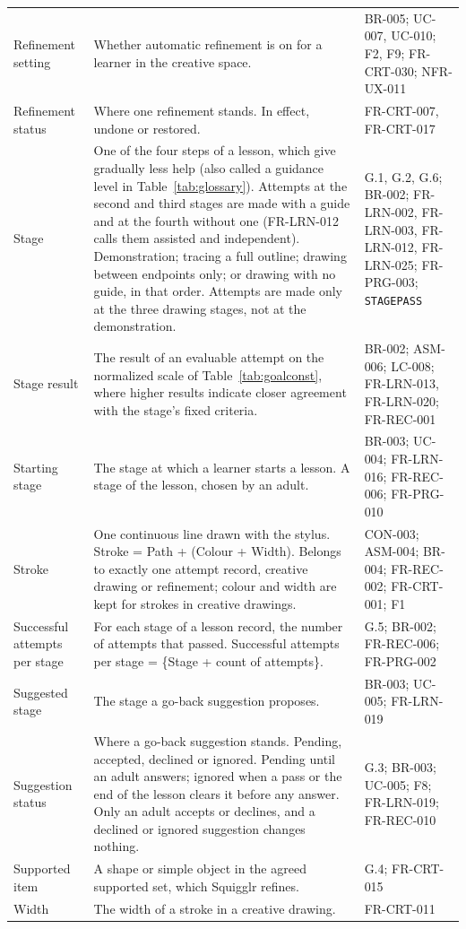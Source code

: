 \documentclass[12pt]{article}
\renewcommand{\_}{\textunderscore\allowbreak}%
\begin{document}
{\begin{longtable}{@{}
  >{\raggedright\arraybackslash}p{}
  >{\raggedright\arraybackslash}p{}
  >{\raggedright\arraybackslash\exhyphenpenalty=10000}p{}@{}}
\addlinespace
Refinement setting & Whether automatic refinement is on for a learner in the
creative space. & BR-005; UC-007, UC-010; F2, F9;
FR-CRT-030; NFR-UX-011 \\
\addlinespace
Refinement status & Where one refinement stands. In effect, undone
or restored. & FR-CRT-007, FR-CRT-017 \\
\addlinespace
Stage & One of the four steps of a lesson, which give gradually less help (also
called a guidance level in Table~\ref{tab:glossary}). Attempts at the second and
third stages are made with a guide and at the fourth without one (FR-LRN-012
calls them assisted and independent). Demonstration; tracing a
full outline; drawing between endpoints only; or drawing with no guide, in that
order. Attempts are made only at the three drawing stages, not at the
demonstration. & G.1, G.2, G.6; BR-002; FR-LRN-002, FR-LRN-003, FR-LRN-012, FR-LRN-025;
FR-PRG-003; \texttt{STAGE\_PASS} \\
\addlinespace
Stage result & The result of an evaluable attempt on the normalized scale of
Table~\ref{tab:goalconst}, where higher results indicate closer agreement with
the stage's fixed criteria. & BR-002; ASM-006; LC-008; FR-LRN-013, FR-LRN-020;
FR-REC-001 \\
\addlinespace
Starting stage & The stage at which a learner starts a lesson. A
stage of the lesson, chosen by an adult. & BR-003; UC-004; FR-LRN-016;
FR-REC-006; FR-PRG-010 \\
\addlinespace
Stroke & One continuous line drawn with the stylus. Stroke = Path + (Colour +
Width). Belongs to exactly one attempt record, creative drawing or
refinement; colour and width are kept for strokes in creative drawings. & CON-003; ASM-004; BR-004; FR-REC-002; FR-CRT-001; F1 \\
\addlinespace
Successful attempts per stage & For each stage of a lesson record, the number of
attempts that passed. Successful attempts per stage = \{Stage + count of
attempts\}. & G.5; BR-002; FR-REC-006;
FR-PRG-002 \\
\addlinespace
Suggested stage & The stage a go-back suggestion proposes. & BR-003; UC-005;
FR-LRN-019 \\
\addlinespace
Suggestion status & Where a go-back suggestion stands. Pending,
accepted, declined or ignored. Pending until an adult answers; ignored when a
pass or the end of the lesson clears it before any answer. Only an adult
accepts or declines, and a declined or ignored suggestion changes nothing. & G.3; BR-003; UC-005; F8; FR-LRN-019;
FR-REC-010 \\
\addlinespace
Supported item & A shape or simple object in the agreed supported set, which
Squigglr refines. & G.4; FR-CRT-015 \\
\addlinespace
Width & The width of a stroke in a creative drawing. & FR-CRT-011 \\
\end{longtable}
}
\end{document}

